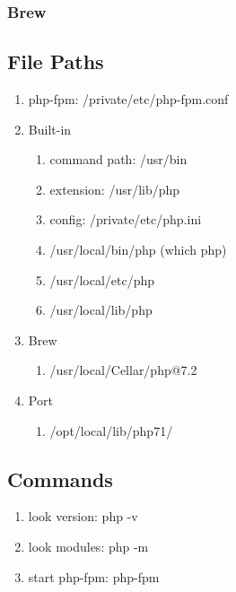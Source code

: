         \subsubsection{Brew}
        
        
    \subsection{File Paths}
        \begin{enumerate}
            \item php-fpm: \colorbox{gray!30}{/private/etc/php-fpm.conf}
            \item Built-in
                \begin{enumerate}
                    \item command path: \colorbox{gray!30}{/usr/bin}
                    
                    \item extension: \colorbox{gray!30}{/usr/lib/php}
                    \item config: \colorbox{gray!30}{/private/etc/php.ini}
                    \item \colorbox{gray!30}{/usr/local/bin/php (which php)}
                    \item \colorbox{gray!30}{/usr/local/etc/php}
                    \item \colorbox{gray!30}{/usr/local/lib/php}
                \end{enumerate}
            \item Brew
                \begin{enumerate}
                    \item \colorbox{gray!30}{/usr/local/Cellar/php@7.2}
                \end{enumerate}
            \item Port
                \begin{enumerate}[(1)]
                    \item \colorbox{gray!30}{/opt/local/lib/php71/}
                \end{enumerate}
        \end{enumerate}
        
        
    \subsection{Commands}
        \begin{enumerate}
            \item look version: \colorbox{gray!30}{php -v}
            \item look modules: \colorbox{gray!30}{php -m}
            \item start php-fpm: \colorbox{gray!30}{php-fpm}
        \end{enumerate}
        
